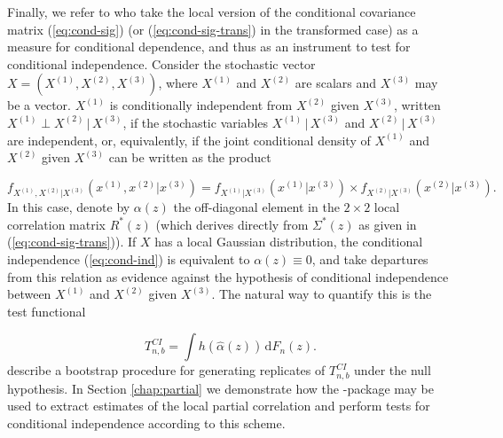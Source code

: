Finally, we refer to \cite{otne:tjos:2019} who take the local version of the conditional covariance matrix (\ref{eq:cond-sig}) (or (\ref{eq:cond-sig-trans}) in the transformed case) as a measure for conditional dependence, and thus as an instrument to test for conditional independence. Consider the stochastic vector $X = \left(X^{\left(1\right)}, X^{\left(2\right)}, X^{\left(3\right)}\right)$, where $X^{\left(1\right)}$ and $X^{\left(2\right)}$ are scalars and $X^{\left(3\right)}$ may be a vector. $X^{\left(1\right)}$ is conditionally independent from $X^{\left(2\right)}$ given $X^{\left(3\right)}$, written $X^{\left(1\right)} \perp X^{\left(2\right)} \,|\,X^{\left(3\right)}$, if the stochastic variables $X^{\left(1\right)}\,|\,X^{\left(3\right)}$ and $X^{\left(2\right)}\,|\,X^{\left(3\right)}$ are independent, or, equivalently, if the joint conditional density of $X^{\left(1\right)}$ and $X^{\left(2\right)}$ given $X^{\left(3\right)}$ can be written as the product

\begin{equation}
f_{X^{\left(1\right)},X^{\left(2\right)}|X^{\left(3\right)}}\left(x^{\left(1\right)}, x^{\left(2\right)}|x^{\left(3\right)}\right) = f_{X^{\left(1\right)}|X^{\left(3\right)}}\left(x^{\left(1\right)}|x^{\left(3\right)}\right) \times f_{X^{\left(2\right)}|X^{\left(3\right)}}\left(x^{\left(2\right)}|x^{\left(3\right)}\right).
\label{eq:cond-ind}
\end{equation}
In this case, denote by $\alpha\left(z\right)$ the off-diagonal element in the $2\times2$ local correlation matrix $R^*\left(z\right)$ (which derives directly from $\Sigma^*\left(z\right)$ as given in (\ref{eq:cond-sig-trans})). If $X$ has a local Gaussian distribution, the conditional independence (\ref{eq:cond-ind}) is equivalent to $\alpha\left(z\right) \equiv 0$, and \cite{otne:tjos:2019} take departures from this relation as evidence against the hypothesis of conditional independence between $X^{\left(1\right)}$ and $X^{\left(2\right)}$ given $X^{\left(3\right)}$. The natural way to quantify this is the test functional

\begin{equation}
T^{CI}_{n, b} = \int h\left(\widehat\alpha\left(z\right)\right) \, \textrm{d}F_n(z).
\label{eq:ci-test-statistic}
\end{equation}
\cite{otne:tjos:2019} describe a bootstrap procedure for generating replicates of $T_{n,b}^{CI}$ under the null hypothesis. In Section \ref{chap:partial} we demonstrate how the -package may be used to extract estimates of the local partial correlation and perform tests for conditional independence according to this scheme.

